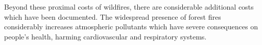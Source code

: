 \documentclass[11pt]{article}
\begin{document}
\begin{spacing}{1.3}
Beyond these proximal costs of wildfires, there are considerable additional costs which have been documented.  The widespread presence of forest fires considerably increases atmospheric pollutants which have severe consequences on people's health, harming cardiovascular and respiratory systems. %





\end{spacing}
\end{document}
